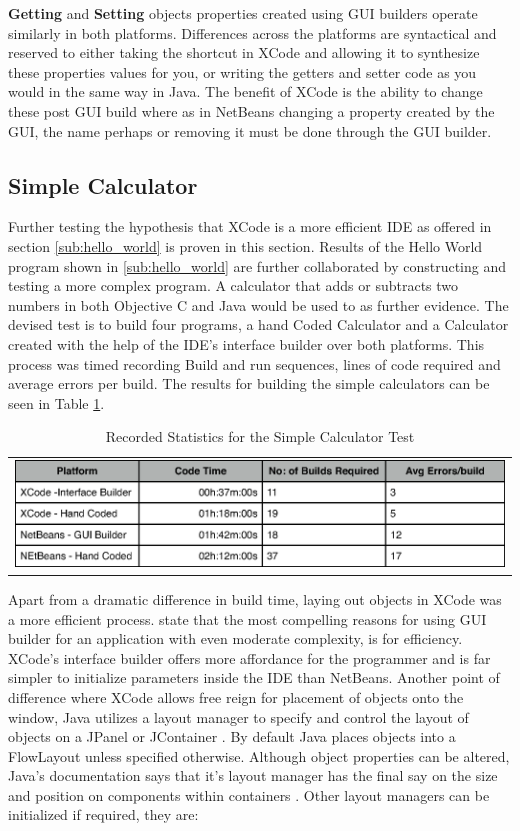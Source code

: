 \documentclass[a4paper,14pt]{article}
\begin{document}
\textbf{Getting} and \textbf{Setting} objects properties created using GUI builders operate similarly in both platforms. Differences across the platforms are syntactical and reserved to either taking the shortcut in XCode and allowing it to synthesize these properties values for you, or writing the getters and setter code as you would in the same way in Java. The benefit of XCode is the ability to change these post GUI build where as in NetBeans changing a property created by the GUI, the name perhaps or removing it must be done through the GUI builder.

\subsection{Simple Calculator} %
\label{sub:simple_calculator}
Further testing the hypothesis that XCode is a more efficient IDE as offered in section \ref{sub:hello_world} is proven in this section. Results of the Hello World program shown in \ref{sub:hello_world} are further collaborated by constructing and testing a more complex program. A calculator that adds or subtracts two numbers in both Objective C and Java would be used to as further evidence. The devised test is to build four programs, a hand Coded Calculator and a Calculator created with the help of the IDE's interface builder over both platforms. This process was timed recording Build and run sequences, lines of code required and average errors per build. The results for building the simple calculators can be seen in Table \ref{table:simplecalc}. 
\begin{table}[H]
\centering
\begin{tabular}{l}
\includegraphics[scale=0.65]{simplecalculator.eps}
\end{tabular}
\caption{Recorded Statistics for the Simple Calculator Test}
\label{table:simplecalc}
\end{table}
Apart from a dramatic difference in build time, laying out objects in XCode was a more efficient process.  state that the most compelling reasons for using GUI builder for an application with even moderate complexity, is for efficiency. XCode's interface builder offers more affordance for the programmer and is far simpler to initialize parameters inside the IDE than NetBeans. Another point of difference where XCode allows free reign for placement of objects onto the window, Java utilizes a layout manager to specify and control the layout of objects on a JPanel or JContainer \cite{nla.cat-vn3060178}. By default Java places objects into a FlowLayout unless specified otherwise. Although object properties can be altered, Java's documentation says that it's layout manager has the final say on the size and position on components within containers \cite{Oracle2011}. Other layout managers can be initialized if required, they are:
\end{document}
